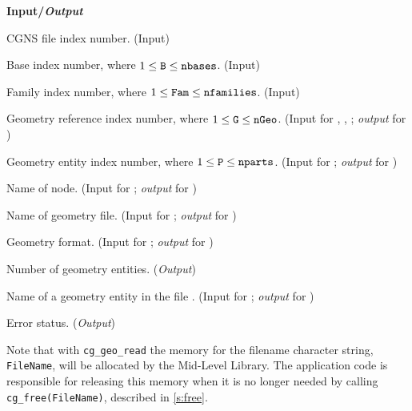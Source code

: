 \noindent
\textbf{\textcolor{input}{Input}/\textcolor{output}{\textit{Output}}}

\begin{Ventryi}{}\raggedright
\item [\fort{fn}]
      CGNS file index number.
      (\textcolor{input}{Input})
\item [\fort{B}]
      Base index number, where $1 \leq \text{{\normalfont\texttt{B}}} \leq \text{{\normalfont\texttt{nbases}}}$.
      (\textcolor{input}{Input})
\item [\fort{Fam}]
      Family index number, where $1 \leq \text{{\normalfont\texttt{Fam}}} \leq \text{{\normalfont\texttt{nfamilies}}}$.
      (\textcolor{input}{Input})
\item [\fort{G}]
      Geometry reference index number, where $1 \leq \text{{\normalfont\texttt{G}}} \leq \text{{\normalfont\texttt{nGeo}}}$.
      (\textcolor{input}{Input} for ,
      , ;
      \textcolor{output}{\textit{output}} for )
\item [\fort{P}]
      Geometry entity index number, where $1 \leq \text{{\normalfont\texttt{P}}} \leq \text{{\normalfont\texttt{nparts}}}$.
      (\textcolor{input}{Input} for ;
      \textcolor{output}{\textit{output}} for )
\item [\fort{GeoName}]
      Name of  node.
      (\textcolor{input}{Input} for ;
      \textcolor{output}{\textit{output}} for )
\item [\fort{FileName}]
      Name of geometry file.
      (\textcolor{input}{Input} for ;
      \textcolor{output}{\textit{output}} for )
\item [\fort{CADSystem}]
      Geometry format.
      (\textcolor{input}{Input} for ;
      \textcolor{output}{\textit{output}} for )
\item [\fort{nparts}]
      Number of geometry entities.
      (\textcolor{output}{\textit{Output}})
\item [\fort{PartName}]
      Name of a geometry entity in the file .
      (\textcolor{input}{Input} for ;
      \textcolor{output}{\textit{output}} for )
\item [\fort{ier}]
      Error status.
      (\textcolor{output}{\textit{Output}})
\end{Ventryi}

Note that with \texttt{cg\_geo\_read} the memory for the filename
character string, \texttt{FileName}, will be allocated by the Mid-Level
Library.
The application code is responsible for releasing this memory when it is
no longer needed by calling \texttt{cg\_free(FileName)}, described in
\autoref{s:free}.

